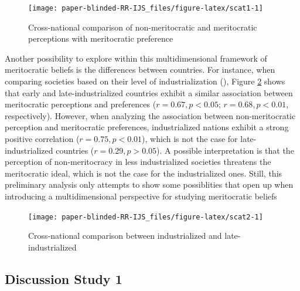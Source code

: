 \documentclass[
  10pt,
  a4paper,
]{article}
\begin{document}
\begin{figure}[H]

{\centering \texttt{[image: paper-blinded-RR-IJS\_files/figure-latex/scat1-1]} 

}

\caption{Cross-national comparison of non-meritocratic and meritocratic perceptions with meritocratic preference}\label{fig:scat1}
\end{figure}

Another possibility to explore within this multidimensional framework of meritocratic beliefs is the differences between countries. For instance, when comparing societies based on their level of industrialization (), Figure \ref{fig:scat2} shows that early and late-industrialized countries exhibit a similar association between meritocratic perceptions and preferences (\(r=0.67, p<0.05\); \(r=0.68, p<0.01\), respectively). However, when analyzing the association between non-meritocratic perception and meritocratic preferences, industrialized nations exhibit a strong positive correlation (\(r=0.75, p<0.01\)), which is not the case for late-industrialized countries (\(r=0.29, p>0.05\)). A possible interpretation is that the perception of non-meritocracy in less industrialized societies threatens the meritocratic ideal, which is not the case for the industrialized ones. Still, this preliminary analysis only attempts to show some possiblities that open up when introducing a multidimensional perspective for studying meritocratic beliefs

\begin{figure}[H]

{\centering \texttt{[image: paper-blinded-RR-IJS\_files/figure-latex/scat2-1]} 

}

\caption{Cross-national comparison between industrialized and late-industrialized}\label{fig:scat2}
\end{figure}

\subsection{Discussion Study 1}\label{discussion-study-1}
\end{document}
